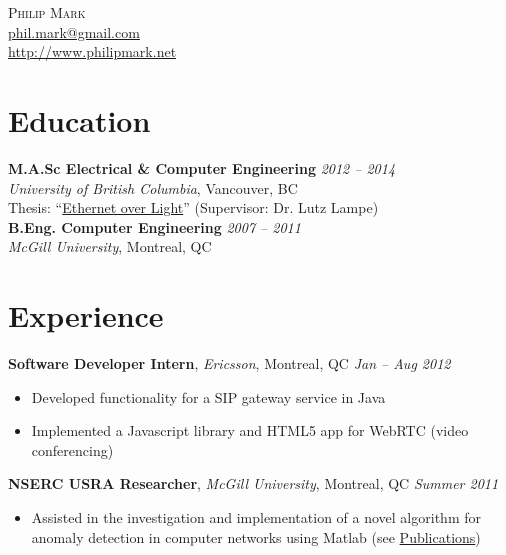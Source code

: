 \documentclass[letterpaper]{article}
\newcommand{\contact}[3]{
  \begin{center}
    {\LARGE \textsc {#1}}\\ \smallskip
    {\href{mailto:#2}{#2}}\\ \medskip
    {\url{#3}}\\ \smallskip
  \end{center}
}
\newcommand{\jobtitle}[4]{
  \textbf{#1}, \emph{#2}, {#3} \hfill \emph{#4}\\
}
\newenvironment{jobdescription}{
  \vspace{-4pt}
  \begin{itemize}
  \setlength{\itemsep}{2pt}
  \setlength{\parskip}{0pt}
  \setlength{\parsep}{0pt}
}{\end{itemize}}
\begin{document}

\contact{Philip Mark}{phil.mark@gmail.com}{http://www.philipmark.net}


\section*{Education}
\textbf{M.A.Sc Electrical \& Computer Engineering}
\hfill \emph{2012 -- 2014}{} \\
\emph{University of British Columbia}, Vancouver, BC \\
Thesis: ``\href{http://circle.ubc.ca/}{Ethernet over Light}'' (Supervisor: Dr.
Lutz Lampe) \\
\medskip 
\textbf{B.Eng. Computer Engineering} \hfill \emph{2007 -- 2011} \\
\emph{McGill University}, Montreal, QC \\
\bigskip

\section*{Experience}
\jobtitle{Software Developer Intern}{Ericsson}{Montreal, QC}{Jan -- Aug 2012}
\begin{jobdescription}
  \item Developed functionality for a SIP gateway service in Java
  \item Implemented a Javascript library and HTML5 app for WebRTC (video
  conferencing)
\end{jobdescription}

\jobtitle{NSERC USRA Researcher}{McGill University}{Montreal, QC}{Summer 2011} 
\begin{jobdescription}
  \item Assisted in the investigation and implementation of a novel
  algorithm for anomaly detection in computer networks using Matlab (see
  \hyperlink{sec:publications}{Publications})
\end{jobdescription}
\end{document}

